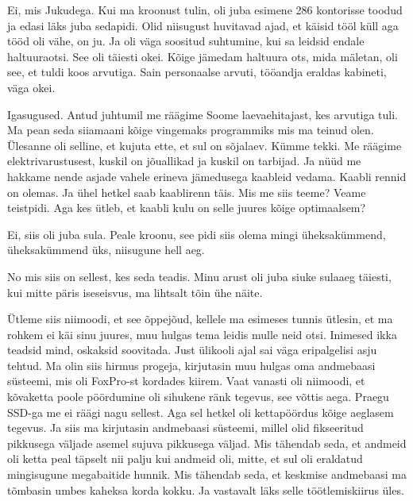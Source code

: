 
Ei, mis Jukudega. Kui ma kroonust tulin, oli juba esimene  286  kontorisse 
toodud ja edasi läks juba sedapidi. Olid niisugust huvitavad ajad, et käisid  
tööl küll aga tööd oli  vähe, on ju.  Ja oli väga soositud suhtumine, kui sa 
leidsid endale haltuuraotsi. See oli täiesti okei. Kõige jämedam haltuura ots, 
mida mäletan, oli see, et tuldi koos arvutiga. Sain personaalse arvuti, 
tööandja eraldas kabineti, väga okei. 


Igasugused. Antud juhtumil me räägime Soome laevaehitajast, kes arvutiga tuli. 
Ma pean seda siiamaani kõige vingemaks programmiks mis ma teinud olen. Ülesanne 
oli selline, et kujuta ette, et sul on sõjalaev. Kümme tekki. Me räägime 
elektrivarustusest, kuskil on jõuallikad ja kuskil on tarbijad. Ja nüüd me 
hakkame nende asjade vahele erineva jämedusega kaableid vedama. Kaabli rennid 
on olemas. Ja ühel hetkel saab kaablirenn täis. Mis me siis teeme? Veame 
teistpidi. Aga kes ütleb, et kaabli kulu on selle juures kõige optimaalsem? 


Ei, siis oli juba sula. Peale kroonu, see pidi siis olema mingi üheksakümmend, 
üheksakümmend üks, niisugune hell aeg.


No mis siis on sellest, kes seda teadis. Minu arust oli juba siuke sulaaeg 
täiesti, kui mitte päris iseseisvus, ma lihtsalt tõin ühe näite. 


Ütleme siis niimoodi, et see õppejõud, kellele ma esimeses tunnis ütlesin, et 
ma rohkem ei käi sinu juures, muu hulgas tema leidis mulle neid otsi. Inimesed 
ikka teadsid mind,  oskaksid soovitada. Just ülikooli ajal sai väga 
eripalgelisi asju tehtud. Ma olin siis hirmus progeja, kirjutasin muu hulgas 
oma andmebaasi süsteemi, mis oli FoxPro-st  kordades kiirem. Vaat vanasti oli 
niimoodi, et kõvaketta poole pöördumine oli sihukene ränk tegevus, see võttis 
aega. Praegu SSD-ga me ei räägi nagu sellest. Aga sel hetkel oli kettapöördus 
kõige aeglasem tegevus. Ja siis ma kirjutasin andmebaasi süsteemi, millel olid 
fikseeritud pikkusega väljade asemel  sujuva pikkusega väljad. Mis tähendab 
seda, et andmeid oli ketta peal täpselt nii palju kui andmeid oli, mitte, et 
sul oli eraldatud mingisugune megabaitide hunnik. Mis tähendab seda, et 
keskmise andmebaasi ma tõmbasin umbes kaheksa korda kokku. Ja vastavalt läks 
selle töötlemiskiirus  üles.

